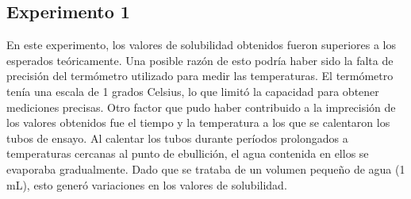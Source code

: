 \documentclass[../main.tex]{subfiles}
\begin{document}
\subsection{Experimento 1}
En este experimento, los valores de solubilidad obtenidos fueron superiores a los esperados teóricamente.
Una posible razón de esto podría haber sido la falta de precisión del termómetro utilizado para medir las temperaturas.
El termómetro tenía una escala de 1 grados Celsius, lo que limitó la capacidad para obtener mediciones precisas.
Otro factor que pudo haber contribuido a la imprecisión de los valores obtenidos fue el tiempo y la temperatura a los 
que se calentaron los tubos de ensayo. Al calentar los tubos durante períodos prolongados a temperaturas cercanas al punto 
de ebullición, el agua contenida en ellos se evaporaba gradualmente. Dado que se trataba de un volumen pequeño de agua (1 mL), 
esto generó variaciones en los valores de solubilidad.
\end{document}

